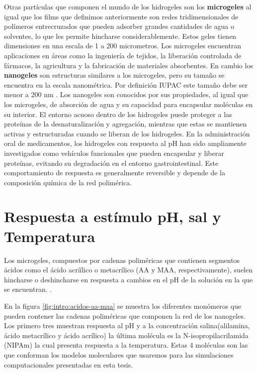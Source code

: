 Otras part\'iculas que componen el mundo de los hidrogeles son los \textbf{microgeles} al igual que los films que definimos anteriormente son redes tridimensionales de pol\'imeros entrecruzados que pueden adsorber grandes cantidades de agua o solventes, lo que les permite hincharse considerablemente. Estos geles tienen dimensiones en una escala de 1 a 200 micrometros. Los microgeles encuentran aplicaciones en \'areas como la ingenier\'ia de tejidos, la liberaci\'on controlada de f\'armacos, la agricultura y la fabricaci\'on de materiales absorbentes. 
En cambio los  \textbf{nanogeles} son estructuras similares a los microgeles, pero su tama\~no se encuentra en la escala nanom\'etrica. Por definici\'on IUPAC este tama\~no debe ser menor a 200 nm \addcite. Los nanogeles son conocidos por sus propiedades, al igual que los microgeles, de absorci\'on de agua y su capacidad para encapsular mol\'eculas en su interior. %
El entorno acuoso dentro de los hidrogeles puede proteger a las prote\'inas de la desnaturalizaci\'on y agregaci\'on, mientras que estas se mantienen activas y estructuradas cuando se liberan de los hidrogeles. 
En la administraci\'on oral de medicamentos, los hidrogeles con respuesta al pH han sido ampliamente investigados como veh\'iculos funcionales que pueden encapsular y liberar prote\'inas, evitando su degradaci\'on en el entorno gastrointestinal.
Este comportamiento de respuesta es  generalmente reversible y depende de la composici\'on qu\'imica de la red polim\'erica.


\section{Respuesta a est\'imulo pH, sal y Temperatura}

Los microgeles, compuestos por cadenas polim\'ericas que contienen segmentos \'acidos como el \'acido acrí\'ilico o metacr\'ilico (AA y MAA, respectivamente), suelen hincharse o deshincharse en respuesta a cambios en el pH de la soluci\'on en la que se encuentran. \cite{snowden1996colloidal}.

En la figura \ref{fig:intro:acidos-aa-maa} se muestra los diferentes mon\'omeros que pueden contener las cadenas polim\'ericas que componen la red de los nanogeles. Los primero tres muestran respuesta al pH y a la concentraci\'on salina(alilamina, \'acido metacr\'ilico y \'acido acr\'ilico) la \'ultima mol\'ecula es la N-isopropilacrilamida (NIPAm) la cual presenta respuesta a la temperatura. 
Estas 4 mol\'eculas son las que conforman los modelos moleculares que usaremos para las simulaciones computacionales presentadas en esta tesis.

